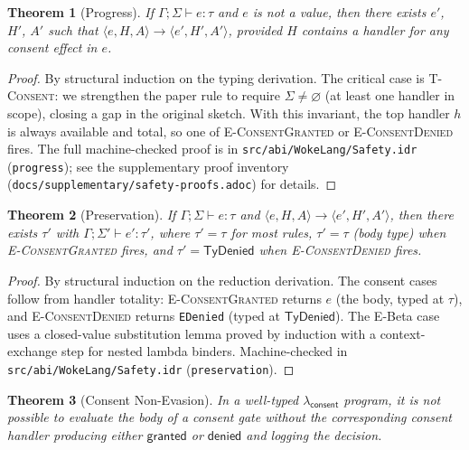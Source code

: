 \documentclass[11pt,a4paper]{article}
\newtheorem{theorem}{Theorem}[section]
\newcommand{\step}{\longrightarrow}
\newcommand{\consent}{\mathsf{consent}}
\newcommand{\granted}{\mathsf{granted}}
\newcommand{\denied}{\mathsf{denied}}
\begin{document}
\begin{theorem}[Progress]
\label{thm:progress}
If $\Gamma; \Sigma \vdash e : \tau$ and $e$ is not a value, then
there exists $e'$, $H'$, $A'$ such that $\langle e, H, A \rangle
\step \langle e', H', A' \rangle$, provided $H$ contains a handler
for any consent effect in $e$.
\end{theorem}

\begin{proof}
By structural induction on the typing derivation.  The critical case
is \textsc{T-Consent}: we strengthen the paper rule to require
$\Sigma \neq \varnothing$ (at least one handler in scope), closing a
gap in the original sketch.  With this invariant, the top handler $h$
is always available and total, so one of \textsc{E-ConsentGranted} or
\textsc{E-ConsentDenied} fires.  The full machine-checked proof is in
\texttt{src/abi/WokeLang/Safety.idr} (\texttt{progress});
see the supplementary proof inventory
(\texttt{docs/supplementary/safety-proofs.adoc}) for details.
\end{proof}

\begin{theorem}[Preservation]
\label{thm:preservation}
If $\Gamma; \Sigma \vdash e : \tau$ and $\langle e, H, A \rangle
\step \langle e', H', A' \rangle$, then there exists $\tau'$ with
$\Gamma; \Sigma' \vdash e' : \tau'$, where $\tau' = \tau$ for most
rules, $\tau' = \tau$ (body type) when \textsc{E-ConsentGranted}
fires, and $\tau' = \mathsf{TyDenied}$ when \textsc{E-ConsentDenied}
fires.
\end{theorem}

\begin{proof}
By structural induction on the reduction derivation.  The consent
cases follow from handler totality: \textsc{E-ConsentGranted} returns
$e$ (the body, typed at $\tau$), and \textsc{E-ConsentDenied} returns
\texttt{EDenied} (typed at $\mathsf{TyDenied}$).  The E-Beta case
uses a closed-value substitution lemma proved by induction with a
context-exchange step for nested lambda binders.  Machine-checked in
\texttt{src/abi/WokeLang/Safety.idr} (\texttt{preservation}).
\end{proof}

\begin{theorem}[Consent Non-Evasion]
\label{thm:non-evasion}
In a well-typed $\lambda_{\consent}$ program, it is not possible to
evaluate the body of a consent gate without the corresponding consent
handler producing either $\granted$ or $\denied$ and logging the
decision.
\end{theorem}
\end{document}

